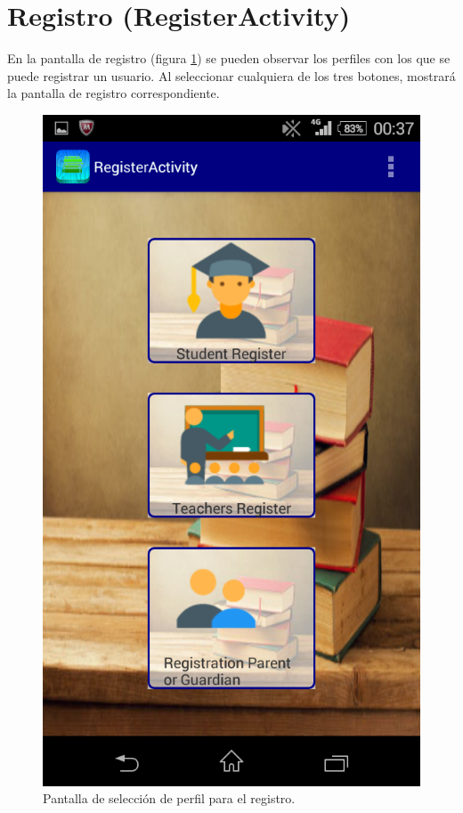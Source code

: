 	\section{Registro (RegisterActivity)} \label{sec:register}
		
		En la pantalla de registro (figura \ref{fig:register}) se pueden observar los perfiles con los que se puede registrar un usuario. Al seleccionar cualquiera de los tres botones, mostrará la pantalla de registro correspondiente.
		
		\begin{figure}[h !]
			\centering
			\includegraphics[scale=0.2]{Imagenes/App/registro}
			\caption{Pantalla de selección de perfil para el registro.}
			\label{fig:register}
		\end{figure}
		
